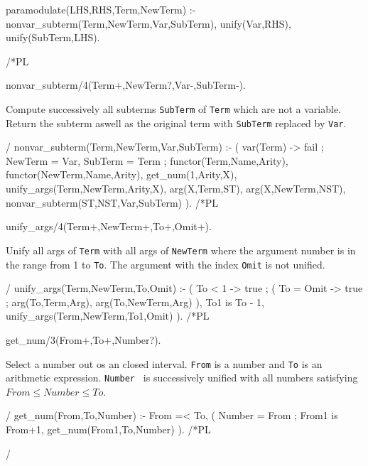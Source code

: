 
paramodulate(LHS,RHS,Term,NewTerm) :-
	nonvar_subterm(Term,NewTerm,Var,SubTerm),
	unify(Var,RHS),
	unify(SubTerm,LHS).
	
/*PL%

\Predicate nonvar_subterm/4(Term+,NewTerm?,Var-,SubTerm-).

Compute successively all subterms \verb|SubTerm| of \verb|Term| which
are not a variable. Return the subterm aswell as the original term
with \verb|SubTerm| replaced by \verb|Var|.

\PL*/
nonvar_subterm(Term,NewTerm,Var,SubTerm) :-
	(   var(Term) -> fail
        ;
	    NewTerm = Var,
	    SubTerm = Term
	;
	    functor(Term,Name,Arity),
	    functor(NewTerm,Name,Arity),
	    get_num(1,Arity,X),
	    unify_args(Term,NewTerm,Arity,X),
	    arg(X,Term,ST),
	    arg(X,NewTerm,NST),
	    nonvar_subterm(ST,NST,Var,SubTerm)
	).
/*PL%

\Predicate unify_args/4(Term+,NewTerm+,To+,Omit+).

Unify all args of \verb|Term| with all args of \verb|NewTerm| where
the argument number is in the range from 1 to \verb|To|. The argument
with the index \verb|Omit| is not unified.

\PL*/
unify_args(Term,NewTerm,To,Omit) :-
	( To < 1    -> true
        ;   ( To = Omit -> true
	    ;    arg(To,Term,Arg),
		 arg(To,NewTerm,Arg)
	    ),
	    To1 is To - 1,
	    unify_args(Term,NewTerm,To1,Omit)
	).
/*PL%

\Predicate get_num/3(From+,To+,Number?).

Select a number out os an closed interval.  \verb|From| is a number
and \verb|To| is an arithmetic expression.  \verb|Number | is
successively unified with all numbers satisfying $From\leq Number\leq
To$.

\PL*/
get_num(From,To,Number) :- 
	From =< To,
	(   Number = From
        ;   From1 is From+1,
	    get_num(From1,To,Number)
	).
/*PL%

\EndProlog */


